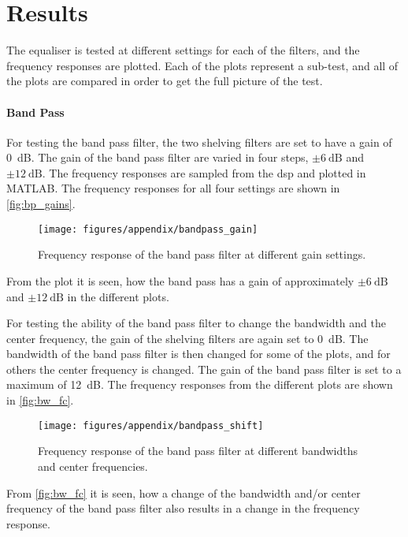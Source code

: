 \section{Results}
The equaliser is tested at different settings for each of the filters, and the frequency responses are plotted. Each of the plots represent a sub-test, and all of the plots are compared in order to get the full picture of the test. 

\paragraph{Band Pass}

For testing the band pass filter, the two shelving filters are set to have a gain of \SI{0}{\deci\bel}. The gain of the band pass filter are varied in four steps, $\pm \SI{6}{\deci\bel}$ and $\pm \SI{12}{\deci\bel}$. The frequency responses are sampled from the \gls{dsp} and plotted in MATLAB. The frequency responses for all four settings are shown in \autoref{fig:bp_gains}.

\begin{figure}[H]
	\centering
	\texttt{[image: figures/appendix/bandpass\_gain]}
	\caption{Frequency response of the band pass filter at different gain settings.}
	\label{fig:bp_gains}
\end{figure}

From the plot it is seen, how the band pass has a gain of approximately $\pm \SI{6}{\deci\bel}$ and $\pm \SI{12}{\deci\bel}$ in the different plots.

For testing the ability of the band pass filter to change the bandwidth and the center frequency, the gain of the shelving filters are again set to \SI{0}{\deci\bel}. The bandwidth of the band pass filter is then changed for some of the plots, and for others the center frequency is changed. The gain of the band pass filter is set to a maximum of \SI{12}{\deci\bel}. The frequency responses from the different plots are shown in \autoref{fig:bw_fc}.

\begin{figure}[H]
	\centering
	\texttt{[image: figures/appendix/bandpass\_shift]}
	\caption{Frequency response of the band pass filter at different bandwidths and center frequencies.}
	\label{fig:bw_fc}
\end{figure}

From \autoref{fig:bw_fc} it is seen, how a change of the bandwidth and/or center frequency of the band pass filter also results in a change in the frequency response.

